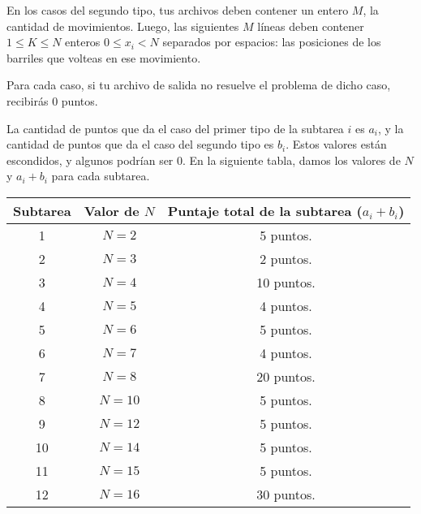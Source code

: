 \documentclass[12pt]{scrartcl}
\begin{document}
        En los casos del segundo tipo, tus archivos deben contener un entero $M$, la cantidad de movimientos. Luego, las siguientes $M$ líneas deben contener $1 \le K \le N$ enteros $0\le x_i < N$ separados por espacios: las posiciones de los barriles que volteas en ese movimiento.

    \eject
    

    Para cada caso, si tu archivo de salida no resuelve el problema de dicho caso, recibirás 0 puntos. 
    
    La cantidad de puntos que da el caso del primer tipo de la subtarea $i$ es $a_i$, y la cantidad de puntos que da el caso del segundo tipo es $b_i$. Estos valores están escondidos, y algunos podrían ser 0. En la siguiente tabla, damos los valores de $N$ y $a_i + b_i$ para cada subtarea.
    
    

    \begin{center}
        \begin{tabular}{|c|c|c|}
            \hline
            Subtarea & Valor de $N$ & Puntaje total de la subtarea ($a_i + b_i$) \\
            \hline
            1 & $N = 2$ & 5 puntos.  \\
            \hline
            2 & $N = 3$ & 2 puntos. \\
            \hline
            3 & $N = 4$ & 10 puntos. \\
            \hline
            4 & $N = 5$ & 4 puntos. \\
            \hline
            5 & $N = 6$ & 5 puntos. \\
            \hline
            6 & $N = 7$ & 4 puntos. \\
            \hline
            7 & $N = 8$ & 20 puntos. \\
            \hline
            8 & $N = 10$ & 5 puntos. \\
            \hline
            9 & $N = 12$ & 5 puntos. \\
            \hline
            10 & $N = 14$ & 5 puntos. \\
            \hline
            11 & $N = 15$ & 5 puntos. \\
            \hline
            12 & $N = 16$ & 30 puntos. \\
            \hline
        \end{tabular}
    \end{center}
    
        

    
    
\end{document}
